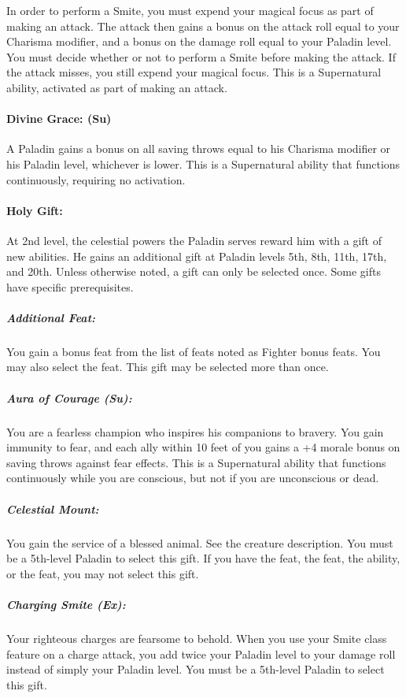 In order to perform a Smite, you must expend your magical focus as part of making an attack.
The attack then gains a bonus on the attack roll equal to your Charisma modifier, and a bonus on the damage roll equal to your Paladin level.
You must decide whether or not to perform a Smite before making the attack. 
If the attack misses, you still expend your magical focus.
This is a Supernatural ability, activated as part of making an attack.

\paragraph{Divine Grace: (Su)} A Paladin gains a bonus on all saving throws equal to his Charisma modifier or his Paladin level, whichever is lower.
This is a Supernatural ability that functions continuously, requiring no activation.

\paragraph{Holy Gift:}
At 2nd level, the celestial powers the Paladin serves reward him with a gift of new abilities. He gains an additional gift at Paladin levels 5th, 8th, 11th, 17th, and 20th. Unless otherwise noted, a gift can only be selected once. Some gifts have specific prerequisites.

\subparagraph{Additional Feat:}
You gain a bonus feat from the list of feats noted as Fighter bonus feats. You may also select the  feat.
This gift may be selected more than once.

\subparagraph{Aura of Courage (Su):}
You are a fearless champion who inspires his companions to bravery.
You gain immunity to fear, and each ally within 10 feet of you gains a +4 morale bonus on saving throws against fear effects.
This is a Supernatural ability that functions continuously while you are conscious, but not if you are unconscious or dead.

\subparagraph[Celestial Mount]{Celestial Mount:}
\label{sec:CelestialMountListing}
You gain the service of a blessed animal. See the  creature description. You must be a 5th-level Paladin to select this gift. If you have the  feat, the  feat, the  ability, or the  feat, you may not select this gift.

\subparagraph{Charging Smite (Ex):}
Your righteous charges are fearsome to behold. When you use your Smite class feature on a charge attack, you add twice your Paladin level to your damage roll instead of simply your Paladin level. You must be a 5th-level Paladin to select this gift.

